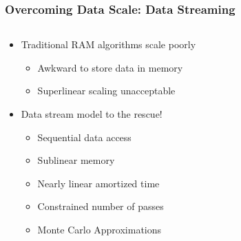 \documentclass{beamer}
\begin{document}

\begin{frame}
\frametitle{Overcoming Data Scale: Data Streaming}


\begin{columns}
\begin{column}{0.55\textwidth}
	\begin{itemize}
		\item Traditional RAM algorithms scale poorly
		\begin{itemize}
			\item Awkward to store data in memory
			\item Superlinear scaling unacceptable
		\end{itemize}
		\item Data stream model to the rescue!
		\begin{itemize}
			\item Sequential data access
			\item Sublinear memory
			\item Nearly linear amortized time
			\item Constrained number of passes
			\item Monte Carlo Approximations
		\end{itemize}
	\end{itemize}
\end{column}
\begin{column}{0.45\textwidth}  %
\begin{center}

\end{center}
\end{column}
\end{columns}
\end{frame}
\end{document}
